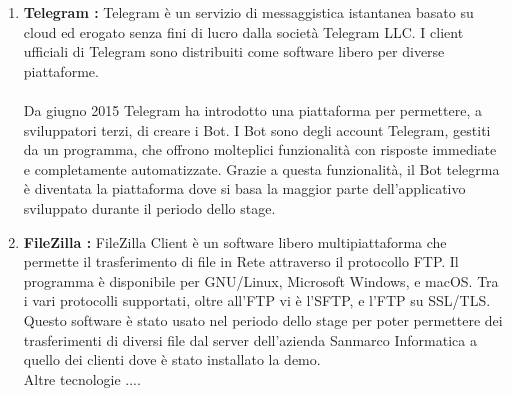 \begin{enumerate}
\item \textbf{Telegram :} Telegram è un servizio di messaggistica istantanea basato su cloud ed erogato senza fini di lucro dalla società Telegram LLC. I client ufficiali di Telegram sono distribuiti come software libero per diverse piattaforme. \\\\
Da giugno 2015 Telegram ha introdotto una piattaforma per permettere, a sviluppatori terzi, di creare i Bot. I Bot sono degli account Telegram, gestiti da un programma, che offrono molteplici funzionalità con risposte immediate e completamente automatizzate. Grazie a questa funzionalità, il Bot telegrma è diventata la piattaforma dove si basa la maggior parte dell’applicativo sviluppato durante il periodo dello stage.

\item \textbf{FileZilla :} FileZilla Client è un software libero multipiattaforma che permette il trasferimento di file in Rete attraverso il protocollo FTP. Il programma è disponibile per GNU/Linux, Microsoft Windows, e macOS. Tra i vari protocolli supportati, oltre all'FTP vi è l'SFTP, e l'FTP su SSL/TLS. 
Questo software è stato usato nel periodo dello stage per poter permettere dei trasferimenti di diversi file dal server dell’azienda Sanmarco Informatica a quello dei clienti dove è stato installato la demo. \\

Altre tecnologie ....\\


\end{enumerate} 






















